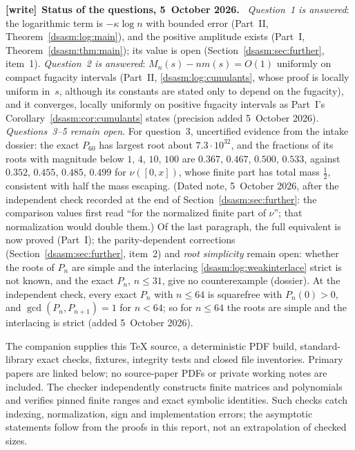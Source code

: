 \documentclass[11pt,letterpaper]{article}
\theoremstyle{remark}\newtheorem{remark}[theorem]{Remark}
\newenvironment{writenote}[1][]{\par\smallskip\begingroup\small
 \noindent\textbf{[write]}\if\relax\detokenize{#1}\relax\else~\textbf{#1.}\fi\ }%
 {\par\endgroup\smallskip}
\begin{document}
\begin{writenote}[Status of the questions, 5~October 2026]
\emph{Question~1 is answered}: the logarithmic term is $-\kappa\log n$ with bounded error (Part~II, Theorem~\ref{dsasm:log:main}), and the positive amplitude exists (Part~I, Theorem~\ref{dsasm:thm:main}); its value is open (Section~\ref{dsasm:sec:further}, item~1). \emph{Question~2 is answered}: $M_n(s)-nm(s)=O(1)$ uniformly on compact fugacity intervals (Part~II, \eqref{dsasm:log:cumulants}, whose proof is locally uniform in~$s$, although its constants are stated only to depend on the fugacity), and it converges, locally uniformly on positive fugacity intervals as Part~I's Corollary~\ref{dsasm:cor:cumulants} states (precision added 5~October 2026). \emph{Questions~3--5 remain open}. For question~3, uncertified evidence from the intake dossier: the exact $P_{60}$ has largest root about $7.3\cdot10^{32}$, and the fractions of its roots with magnitude below $1$, $4$, $10$, $100$ are $0.367$, $0.467$, $0.500$, $0.533$, against $0.352$, $0.455$, $0.485$, $0.499$ for $\nu([0,x])$, whose finite part has total mass $\frac12$, consistent with half the mass escaping. (Dated note, 5~October 2026, after the independent check recorded at the end of Section~\ref{dsasm:sec:further}: the comparison values first read ``for the normalized finite part of $\nu$''; that normalization would double them.) Of the last paragraph, the full equivalent is now proved (Part~I); the parity-dependent corrections (Section~\ref{dsasm:sec:further}, item~2) and \emph{root simplicity} remain open: whether the roots of $P_n$ are simple and the interlacing \eqref{dsasm:log:weakinterlace} strict is not known, and the exact $P_n$, $n\le31$, give no counterexample (dossier). At the independent check, every exact $P_n$ with $n\le64$ is squarefree with $P_n(0)>0$, and $\gcd(P_n,P_{n+1})=1$ for $n<64$; so for $n\le64$ the roots are simple and the interlacing is strict (added 5~October 2026).
\end{writenote}


The companion supplies this TeX source, a deterministic PDF build,
standard-library exact checks, fixtures, integrity tests and closed
file inventories. Primary papers are linked below; no source-paper
PDFs or private working notes are included. The checker independently
constructs finite matrices and polynomials and verifies pinned finite
ranges and exact symbolic identities. Such checks catch indexing,
normalization, sign and implementation errors; the asymptotic
statements follow from the proofs in this report, not an extrapolation
of checked sizes.
\end{document}

